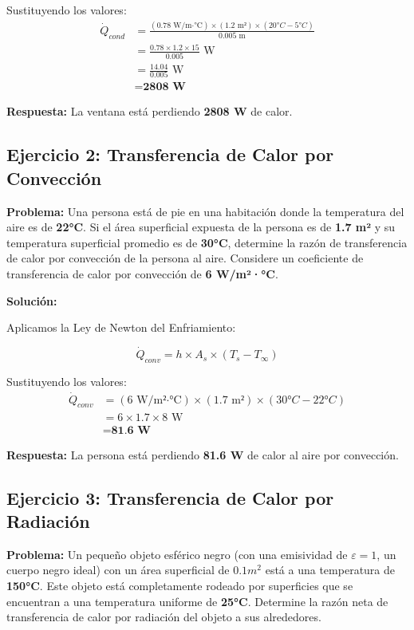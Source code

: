 \documentclass{article}
\begin{document}
    Sustituyendo los valores:
    \begin{align}
    \dot{Q}_{cond} &= \frac{(0.78 \text{ W/m·°C}) \times (1.2 \text{ m²}) \times (20°C - 5°C)}{0.005 \text{ m}} \\
    &= \frac{0.78 \times 1.2 \times 15}{0.005} \text{ W} \\
    &= \frac{14.04}{0.005} \text{ W} \\
    &= \textbf{2808 W}
    \end{align}

    \textbf{Respuesta:} La ventana está perdiendo \textbf{2808 W} de calor.

    \subsection{Ejercicio 2: Transferencia de Calor por Convección}

    \textbf{Problema:} Una persona está de pie en una habitación donde la temperatura del aire es de \textbf{22°C}. Si el área superficial expuesta de la persona es de \textbf{1.7 m²} y su temperatura superficial promedio es de \textbf{30°C}, determine la razón de transferencia de calor por convección de la persona al aire. Considere un coeficiente de transferencia de calor por convección de \textbf{6 W/m²·°C}.

    \textbf{Solución:}

    Aplicamos la Ley de Newton del Enfriamiento:

    \begin{equation}
    \dot{Q}_{conv} = h \times A_s \times (T_s - T_\infty)
    \end{equation}

    Sustituyendo los valores:
    \begin{align}
    \dot{Q}_{conv} &= (6 \text{ W/m²·°C}) \times (1.7 \text{ m²}) \times (30°C - 22°C) \\
    &= 6 \times 1.7 \times 8 \text{ W} \\
    &= \textbf{81.6 W}
    \end{align}

    \textbf{Respuesta:} La persona está perdiendo \textbf{81.6 W} de calor al aire por convección.

    \subsection{Ejercicio 3: Transferencia de Calor por Radiación}

    \textbf{Problema:} Un pequeño objeto esférico negro (con una emisividad de $\varepsilon = 1$, un cuerpo negro ideal) con un área superficial de $0.1 m^2$ está a una temperatura de \textbf{150°C}. Este objeto está completamente rodeado por superficies que se encuentran a una temperatura uniforme de \textbf{25°C}. Determine la razón neta de transferencia de calor por radiación del objeto a sus alrededores.
\end{document}
